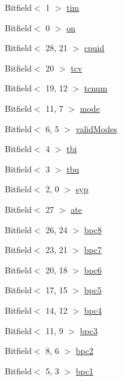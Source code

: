 \begin{DoxyCompactItemize}
\item 
Bitfield$<$ 1 $>$ \hyperlink{namespaceMipsISA_a67731f4398a23c786b0297b441502e1d}{tim}
\item 
Bitfield$<$ 0 $>$ \hyperlink{namespaceMipsISA_a224bbd01abfc298b335097c93c0c7b99}{on}
\item 
Bitfield$<$ 28, 21 $>$ \hyperlink{namespaceMipsISA_ad8c57e94aa3e790a8d7259e5b798123b}{cpuid}
\item 
Bitfield$<$ 20 $>$ \hyperlink{namespaceMipsISA_ad330cc9efdc7c52976bf04e5cf1ffcc7}{tcv}
\item 
Bitfield$<$ 19, 12 $>$ \hyperlink{namespaceMipsISA_a8d94837795e38cfe435762ab4cccd05d}{tcnum}
\item 
Bitfield$<$ 11, 7 $>$ \hyperlink{namespaceMipsISA_ae317cde5969f1a58116b73ae0d8adec0}{mode}
\item 
Bitfield$<$ 6, 5 $>$ \hyperlink{namespaceMipsISA_ad5c29b27e529af3e788395fdaf063787}{validModes}
\item 
Bitfield$<$ 4 $>$ \hyperlink{namespaceMipsISA_a26e278edde701c4a4573f1c17a87bd6e}{tbi}
\item 
Bitfield$<$ 3 $>$ \hyperlink{namespaceMipsISA_aad4c85ae8f386c74dfa7dd7fcf09c921}{tbu}
\item 
Bitfield$<$ 2, 0 $>$ \hyperlink{namespaceMipsISA_ab020cd9a82d07f268f3b10523d607efd}{syp}
\item 
Bitfield$<$ 27 $>$ \hyperlink{namespaceMipsISA_a02e1efd8c21a9ceba960d9428265280d}{ate}
\item 
Bitfield$<$ 26, 24 $>$ \hyperlink{namespaceMipsISA_a90ea352a32fec899e528c966701b6c5a}{bpc8}
\item 
Bitfield$<$ 23, 21 $>$ \hyperlink{namespaceMipsISA_a8a7572e06c7fcb1aac7d4fe46e384e59}{bpc7}
\item 
Bitfield$<$ 20, 18 $>$ \hyperlink{namespaceMipsISA_a0cd07b493bfb52d3b9764ec34390303f}{bpc6}
\item 
Bitfield$<$ 17, 15 $>$ \hyperlink{namespaceMipsISA_ab4ac96a2450ae9760798b1be71fa3c96}{bpc5}
\item 
Bitfield$<$ 14, 12 $>$ \hyperlink{namespaceMipsISA_a95e55a098a49837af1e912a1f1ef1c70}{bpc4}
\item 
Bitfield$<$ 11, 9 $>$ \hyperlink{namespaceMipsISA_ab22a4b275a3efd7500855165e7814fb0}{bpc3}
\item 
Bitfield$<$ 8, 6 $>$ \hyperlink{namespaceMipsISA_a09ea43ad940d89a703c976fb61b7c5fa}{bpc2}
\item 
Bitfield$<$ 5, 3 $>$ \hyperlink{namespaceMipsISA_accda4f6fb428c55d60cb8b881f1ac918}{bpc1}

\end{DoxyCompactItemize}
